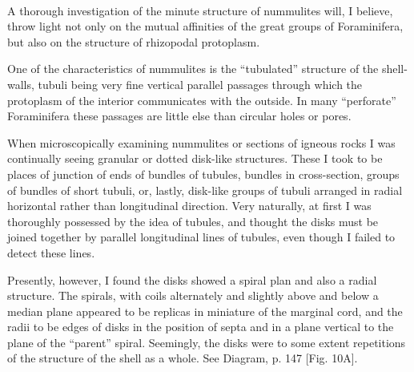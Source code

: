 \documentclass[a4paper, 12pt, oneside]{article}
\begin{document}
\paragraph{}
A thorough investigation of the minute structure of nummulites will, I believe, throw light not only on the mutual affinities of the great groups of Foraminifera, but also on the structure of rhizopodal protoplasm.

One of the characteristics of nummulites is the ``tubulated'' structure of the shell-walls, tubuli being very fine vertical parallel passages through which the protoplasm of the interior communicates with the outside. In many ``perforate'' Foraminifera these passages are little else than circular holes or pores.

When microscopically examining nummulites or sections of igneous rocks I was continually seeing granular or dotted disk-like structures. These I took to be places of junction of ends of bundles of tubules, bundles in cross-section, groups of bundles of short tubuli, or, lastly, disk-like groups of tubuli arranged in radial horizontal rather than longitudinal direction. Very naturally, at first I was thoroughly possessed by the idea of tubules, and thought the disks must be joined together by parallel longitudinal lines of tubules, even though I failed to detect these lines.

Presently, however, I found the disks showed a spiral plan and also a radial structure. The spirals, with coils alternately and slightly above and below a median plane appeared to be replicas in miniature of the marginal cord, and the radii to be edges of disks in the position of septa and in a plane vertical to the plane of the ``parent'' spiral. Seemingly, the disks were to some extent repetitions of the structure of the shell as a whole. See Diagram, p. 147 [Fig. 10A].
\end{document}
